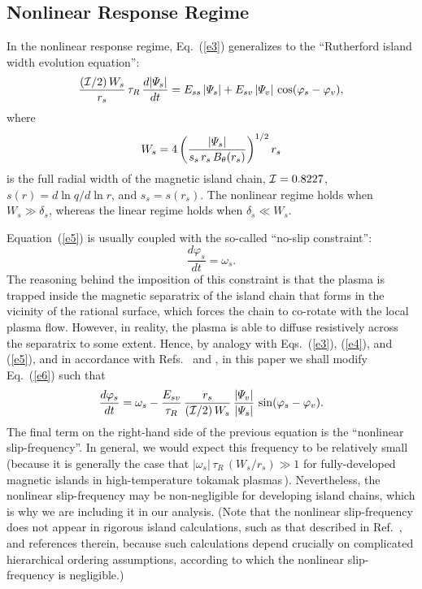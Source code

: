 \documentclass[12pt,prb,aps]{revtex4-1}
\begin{document}
\subsection{Nonlinear Response Regime}
In the nonlinear response regime, Eq.~(\ref{e3}) generalizes to the ``Rutherford island width evolution equation'':\,\cite{ruth,ruth1}
\begin{equation}\label{e5}
\frac{({\cal I}/2)\,W_s}{r_s}\,\tau_R\,\frac{d|{\mit\Psi}_s|}{dt} = E_{ss}\,|{\mit\Psi}_s| + E_{sv}\,|{\mit\Psi}_v|\,\cos(\varphi_s-\varphi_v),
\end{equation}
where
\begin{equation}
W_s = 4\left(\frac{|{\mit\Psi}_s|}{s_s\,r_s\,B_\theta(r_s)}\right)^{1/2} r_s
\end{equation}
is the full radial width of the magnetic island chain, ${\cal I} = 0.8227$, $s(r) = d\ln q/d\ln r$, and $s_s=s(r_s)$. The
nonlinear regime holds when $W_s\gg \delta_s$, whereas the linear regime holds when $\delta_s\ll W_s$. 

Equation~(\ref{e5}) is usually coupled with the so-called ``no-slip constraint'':\,\cite{rfa}
\begin{equation}\label{e6}
\frac{d\varphi_s}{dt} = \omega_s.
\end{equation}
The reasoning behind the imposition of this constraint is that the plasma is trapped inside the
magnetic separatrix of the  island chain that forms in the vicinity of the rational surface,
which forces the chain to co-rotate with the local plasma flow. However, in reality, the plasma
is able to diffuse resistively across the separatrix to some extent. Hence, by analogy with Eqs.~(\ref{e3}), (\ref{e4}), and (\ref{e5}), and 
in accordance with Refs.~ and , in this paper we shall modify Eq.~(\ref{e6}) such that
\begin{equation}\label{e7}
\frac{d\varphi_s}{dt} = \omega_s - \frac{E_{sv}}{\tau_R}\,\frac{r_s}{({\cal I}/2)\,W_s}\,\frac{|{\mit\Psi}_v|}{|{\mit\Psi}_s|}\,\sin(\varphi_s-\varphi_v).
\end{equation}
The final term on the right-hand side of the previous equation is the ``nonlinear slip-frequency''. In general,
we would expect this frequency to be relatively small (because it is generally the case that $|\omega_s|\,\tau_R\,(W_s/r_s)\gg 1$
for fully-developed magnetic islands in high-temperature tokamak plasmas\,\cite{rf1,slip2}). Nevertheless, the
nonlinear slip-frequency may be non-negligible for developing island chains, which is why we are including it in our analysis.
(Note that the nonlinear slip-frequency does not appear in rigorous island calculations, such as
that described in Ref.~, and references therein, because such calculations depend crucially on
complicated hierarchical ordering assumptions, according to which the nonlinear slip-frequency is negligible.)
\end{document}
